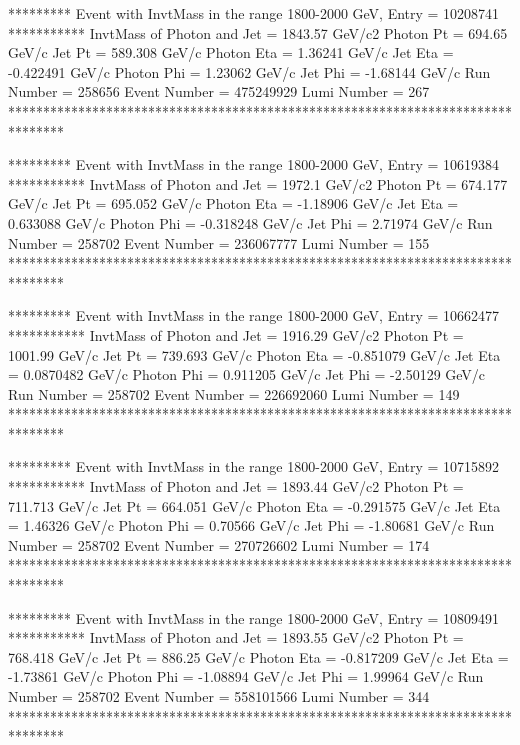                                                                      
********* Event with InvtMass in the range 1800-2000 GeV, Entry = 10208741 ***********
InvtMass of Photon and Jet = 1843.57 GeV/c2
Photon Pt = 694.65 GeV/c
Jet Pt = 589.308 GeV/c
Photon Eta = 1.36241 GeV/c
Jet Eta = -0.422491 GeV/c
Photon Phi = 1.23062 GeV/c
Jet Phi = -1.68144 GeV/c
Run Number = 258656
Event Number = 475249929
Lumi Number = 267
********************************************************************************
                                                                     
                                                                     
********* Event with InvtMass in the range 1800-2000 GeV, Entry = 10619384 ***********
InvtMass of Photon and Jet = 1972.1 GeV/c2
Photon Pt = 674.177 GeV/c
Jet Pt = 695.052 GeV/c
Photon Eta = -1.18906 GeV/c
Jet Eta = 0.633088 GeV/c
Photon Phi = -0.318248 GeV/c
Jet Phi = 2.71974 GeV/c
Run Number = 258702
Event Number = 236067777
Lumi Number = 155
********************************************************************************
                                                                     
                                                                     
********* Event with InvtMass in the range 1800-2000 GeV, Entry = 10662477 ***********
InvtMass of Photon and Jet = 1916.29 GeV/c2
Photon Pt = 1001.99 GeV/c
Jet Pt = 739.693 GeV/c
Photon Eta = -0.851079 GeV/c
Jet Eta = 0.0870482 GeV/c
Photon Phi = 0.911205 GeV/c
Jet Phi = -2.50129 GeV/c
Run Number = 258702
Event Number = 226692060
Lumi Number = 149
********************************************************************************
                                                                     
                                                                     
********* Event with InvtMass in the range 1800-2000 GeV, Entry = 10715892 ***********
InvtMass of Photon and Jet = 1893.44 GeV/c2
Photon Pt = 711.713 GeV/c
Jet Pt = 664.051 GeV/c
Photon Eta = -0.291575 GeV/c
Jet Eta = 1.46326 GeV/c
Photon Phi = 0.70566 GeV/c
Jet Phi = -1.80681 GeV/c
Run Number = 258702
Event Number = 270726602
Lumi Number = 174
********************************************************************************
                                                                     
                                                                     
********* Event with InvtMass in the range 1800-2000 GeV, Entry = 10809491 ***********
InvtMass of Photon and Jet = 1893.55 GeV/c2
Photon Pt = 768.418 GeV/c
Jet Pt = 886.25 GeV/c
Photon Eta = -0.817209 GeV/c
Jet Eta = -1.73861 GeV/c
Photon Phi = -1.08894 GeV/c
Jet Phi = 1.99964 GeV/c
Run Number = 258702
Event Number = 558101566
Lumi Number = 344
********************************************************************************
                                                                     
